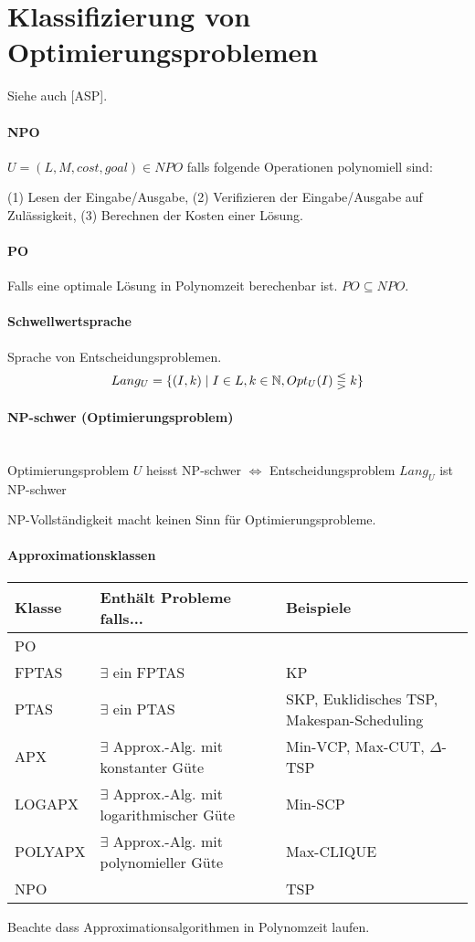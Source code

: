 \section{Klassifizierung von Optimierungsproblemen}

Siehe auch [ASP].

\paragraph{NPO}
$U = (L, M, cost, goal) \in NPO$ falls folgende Operationen polynomiell sind:

(1) Lesen der Eingabe/Ausgabe, (2) Verifizieren der Eingabe/Ausgabe auf Zulässigkeit,
(3) Berechnen der Kosten einer Lösung.

\paragraph{PO} Falls eine optimale Lösung in Polynomzeit berechenbar ist. $PO \subseteq NPO$.

\paragraph{Schwellwertsprache}
Sprache von Entscheidungsproblemen.
$$ Lang_U = \{ (I,k) \; | \; I \in L, k \in \mathbb{N}, Opt_U(I) \lesseqgtr  k\} $$

\paragraph{NP-schwer (Optimierungsproblem)} \mbox{}\\
Optimierungsproblem $U$ heisst NP-schwer $\iff$ Entscheidungsproblem $Lang_U$ ist NP-schwer

NP-Vollständigkeit macht keinen Sinn für Optimierungsprobleme.

\paragraph{Approximationsklassen} \mbox{}
\begin{table}[h]
    \centering
    \begin{tabular}{lll}
    Klasse & Enthält Probleme falls... & Beispiele \\ \hline
    PO & & \\
    FPTAS & $\exists$ ein FPTAS & KP \\
    PTAS & $\exists$ ein PTAS & SKP, Euklidisches TSP, Makespan-Scheduling \\
    APX & $\exists$ Approx.-Alg. mit konstanter Güte & Min-VCP, Max-CUT, $\Delta$-TSP \\
    LOGAPX & $\exists$ Approx.-Alg. mit logarithmischer Güte & Min-SCP \\
    POLYAPX & $\exists$ Approx.-Alg. mit polynomieller Güte & Max-CLIQUE \\
    NPO &  & TSP \\
    \end{tabular}
\end{table}
Beachte dass Approximationsalgorithmen in Polynomzeit laufen.
